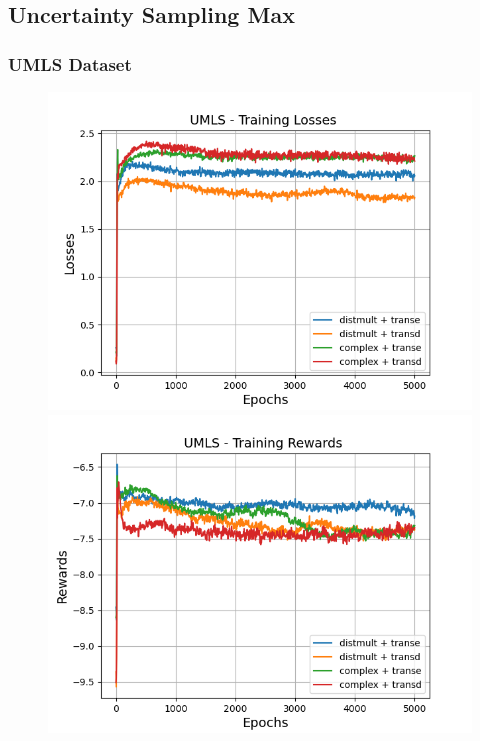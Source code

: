\subsection{Uncertainty Sampling Max}

\subsubsection{UMLS Dataset}

\begin{figure}
    \centering
    \begin{minipage}{.5\textwidth}
      \centering
      \includegraphics[width=0.9\linewidth]{figures/results/gan_train/pretrained/uncertainty/max/entropy/umls/gan_train_uncertainty_umls_losses.png}
    \end{minipage}%
    \begin{minipage}{.5\textwidth}
      \centering
      \includegraphics[width=0.9\linewidth]{figures/results/gan_train/pretrained/uncertainty/max/entropy/umls/gan_train_uncertainty_umls_rewards.png}

\end{minipage}
\end{figure}
